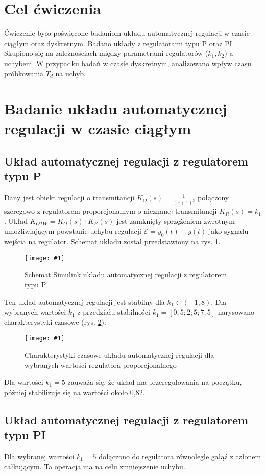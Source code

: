 \documentclass[12pt]{article}
\begin{document}
\newcommand{\zdjecie}[3]
{
    \begin{figure}[H]
        \renewcommand{\figurename}{Rys.}
        \centering
        \texttt{[image: \#1]}
        \caption{#2}
        \label{#3}
    \end{figure}
}


\tableofcontents
\newpage

\section{Cel ćwiczenia}
Ćwiczenie było poświęcone badaniom układu automatycznej regulacji w czasie ciągłym oraz dyskretnym. Badano układy z regulatorami typu P oraz PI. Skupiono się na zależnościach między parametrami regulatorów ($k_1, k_2$) a uchybem. W przypadku badań w czasie dyskretnym, analizowano wpływ czasu próbkowania $T_d$ na uchyb.
\section{Badanie układu automatycznej regulacji w czasie ciągłym}
\subsection{Układ automatycznej regulacji z regulatorem typu P}
Dany jest obiekt regulacji o transmitancji $K_O(s) = \frac{1}{(s+1)^3}$ połączony szeregowo z regulatorem proporcjonalnym o nieznanej transmitancji $K_R(s)=k_1$. Układ $K_{OTW} = K_O(s) \cdot K_R(s)$ jest zamknięty sprzężeniem zwrotnym umożliwiającym powstanie uchybu regulacji $ \mathcal{E} = y_0(t) - y(t)$ jako sygnału wejścia na regulator. Schemat układu został przedstawiony na rys. \ref{schemat_p}.

\zdjecie{sim_p.png}{Schemat Simulink układu automatycznej regulacji z regulatorem typu P}{schemat_p}

Ten układ automatycznej regulacji jest stabilny dla $k_1 \in (-1, 8) $. Dla wybranych wartości $k_1$ z przedziału stabilności $ k_1 = [0,5 ; 2 ; 5 ; 7,5] $ narysowano charakterystyki czasowe (rys. \ref{czasowe}).

\zdjecie{reg_p.png}{Charakterystyki czasowe układu automatycznej regulacji dla wybranych wartości regulatora proporcjonalnego}{czasowe}

Dla wartości $k_1 = 5$ zauważa się, że układ ma przeregulowania na początku, później stabilizuje się na wartości około 0,82. 

\subsection{Układ automatycznej regulacji z regulatorem typu PI}
Dla wybranej wartości $k_1 = 5$ dołączono do regulatora równolegle gałąź z członem całkującym. Ta operacja ma na celu zmniejszenie uchybu.
\end{document}
